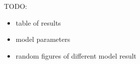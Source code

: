 \label{sec:results}
TODO:
\begin{itemize}
\item table of results
\item model parameters
\item random figures of different model result
\end{itemize}

